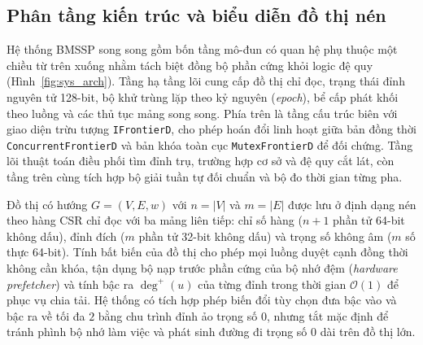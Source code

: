 \subsection{Phân tầng kiến trúc và biểu diễn đồ thị nén}\label{subsec:c2-arch}

Hệ thống BMSSP song song gồm bốn tầng mô-đun có quan hệ phụ thuộc một chiều từ trên xuống nhằm tách biệt đồng bộ phần cứng khỏi logic đệ quy (Hình~\ref{fig:sys_arch}). Tầng hạ tầng lõi cung cấp đồ thị chỉ đọc, trạng thái đỉnh nguyên tử 128-bit, bộ khử trùng lặp theo kỷ nguyên (\textit{epoch}), bể cấp phát khối theo luồng và các thủ tục mảng song song. Phía trên là tầng cấu trúc biên với giao diện trừu tượng \texttt{IFrontierD}, cho phép hoán đổi linh hoạt giữa bản đồng thời \texttt{Concurrent\allowbreak FrontierD} và bản khóa toàn cục \texttt{Mutex\allowbreak FrontierD} để đối chứng. Tầng lõi thuật toán điều phối tìm đỉnh trụ, trường hợp cơ sở và đệ quy cắt lát, còn tầng trên cùng tích hợp bộ giải tuần tự đối chuẩn và bộ đo thời gian từng pha.

Đồ thị có hướng $G = (V, E, w)$ với $n = |V|$ và $m = |E|$ được lưu ở định dạng nén theo hàng CSR chỉ đọc với ba mảng liên tiếp: chỉ số hàng ($n + 1$ phần tử 64-bit không dấu), đỉnh đích ($m$ phần tử 32-bit không dấu) và trọng số không âm ($m$ số thực 64-bit). Tính bất biến của đồ thị cho phép mọi luồng duyệt cạnh đồng thời không cần khóa, tận dụng bộ nạp trước phần cứng của bộ nhớ đệm (\textit{hardware prefetcher}) và tính bậc ra $\deg^+(u)$ của từng đỉnh trong thời gian $\mathcal{O}(1)$ để phục vụ chia tải. Hệ thống có tích hợp phép biến đổi tùy chọn đưa bậc vào và bậc ra về tối đa $2$ bằng chu trình đỉnh ảo trọng số $0$, nhưng tắt mặc định để tránh phình bộ nhớ làm việc và phát sinh đường đi trọng số $0$ dài trên đồ thị lớn.

